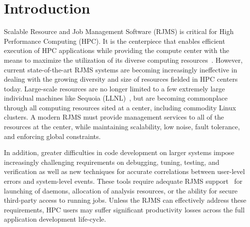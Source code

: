 \section{Introduction}

Scalable Resource and Job Management Software (RJMS) is critical
for High Performance Computing (HPC).
It is the centerpiece that enables efficient
execution of HPC applications while providing
the compute center with the means
to maximize the utilization of its diverse  
 computing resources~\cite{GeorgiouThesis}.
However, current state-of-the-art RJMS systems 
are becoming increasingly
ineffective in dealing with the growing diversity and size 
of resources fielded in HPC centers today. Large-scale 
resources are no longer limited to  
a few extremely large individual machines 
like Sequoia (LLNL)~\cite{sequoia}, %
but are becoming commonplace through all computing resources sited at a center, including
commodity Linux clusters.
A modern RJMS must provide management services 
to all of the resources at the center,
while maintaining
scalability, low noise, fault tolerance, and enforcing global constraints.

In addition, greater difficulties in code development
on larger systems impose increasingly challenging
requirements on 
debugging, tuning, testing, and verification
as well as new techniques for 
accurate correlations between user-level errors
and system-level events.
These tools
require adequate RJMS support~\cite{STAT,SPINDLE,PRUNER,SCR,launchmon}
for launching of daemons, allocation of analysis resources, or the ability
for secure third-party access to running jobs.
Unless the RJMS can effectively
address these requirements, HPC users 
may suffer significant productivity losses
across the full application development life-cycle. 

